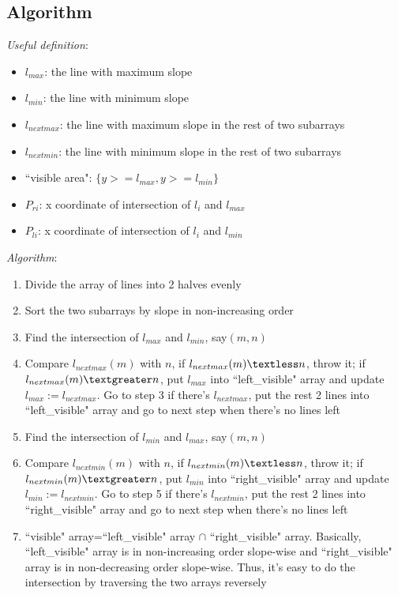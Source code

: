 \documentclass[11pt]{article}
\begin{document}
\subsection{Algorithm}
\emph{Useful definition}:
\begin{itemize}
	\item $l_{max}$: the line with maximum slope
	\item $l_{min}$: the line with minimum slope
	\item $l_{nextmax}$: the line with maximum slope in the rest of two subarrays
	\item $l_{nextmin}$: the line with minimum slope in the rest of two subarrays
	\item ``visible area": $\{y>=l_{max}, y>=l_{min}\}$
	\item $P_{ri}$: x coordinate of intersection of $l_{i}$ and $l_{max}$
	\item $P_{li}$: x coordinate of intersection of $l_{i}$ and $l_{min}$
\end{itemize}
\emph{Algorithm}:
\begin{enumerate}
	\item Divide the array of lines into 2 halves evenly
	\item Sort the two subarrays by slope in non-increasing order
	\item Find the intersection of $l_{max}$ and $l_{min}$, say$(m, n)$
	\item Compare $l_{nextmax}(m)$ with $n$,  if $l_{nextmax}(m) \textless n$, throw it; if $l_{nextmax}(m) \textgreater n$, put $l_{max}$ into ``left\_visible" array and update $l_{max} := l_{nextmax}$. Go to step 3 if there's $l_{nextmax}$, put the rest 2 lines into ``left\_visible" array and go to next step when there's no lines left
	\item Find the intersection of $l_{min}$ and $l_{max}$, say$(m, n)$
	\item Compare $l_{nextmin}(m)$ with $n$,  if $l_{nextmin}(m) \textless n$, throw it; if $l_{nextmin}(m) \textgreater n$, put $l_{min}$ into ``right\_visible" array and update $l_{min} := l_{nextmin}$. Go to step 5 if there's $l_{nextmin}$, put the rest 2 lines into ``right\_visible" array and go to next step when there's no lines left
	\item ``visible" array=``left\_visible" array $\cap$ ``right\_visible" array. Basically, ``left\_visible" array is in non-increasing order slope-wise and ``right\_visible" array is in non-decreasing order slope-wise. Thus, it's easy to do the intersection by traversing the two arrays reversely
\end{enumerate}
\end{document}

